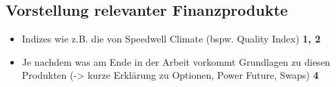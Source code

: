 \newpage
\subsection{Vorstellung relevanter Finanzprodukte}
\label{sec:Vorstellung relevanter Finanzprodukte}
\begin{itemize}

    \item Indizes wie z.B. die von Speedwell Climate  (bspw. Quality Index) \textbf{1, 2}
    \item Je nachdem was am Ende in der Arbeit vorkommt Grundlagen zu diesen Produkten (-> kurze Erklärung zu Optionen, Power Future, Swaps) \textbf{4}
    
\end{itemize}
